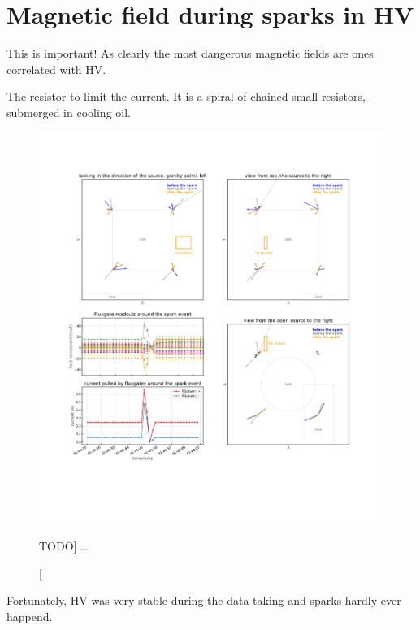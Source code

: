 

\section{Magnetic field during sparks in HV}


This is important! As clearly the most dangerous magnetic fields are ones correlated with HV.

The resistor to limit the current. It is a spiral of chained small resistors, submerged in cooling oil.

\begin{figure}
  \centering
  \includegraphics[width=\linewidth]{gfx/nEDM_SFC/SFC_during_spark_event_thesis.pdf}
  \caption
  [TODO]
  {\ldots}
  \label{fig:field_when_sparking}
\end{figure}


Fortunately, HV was very stable during the data taking and sparks hardly ever happend.

